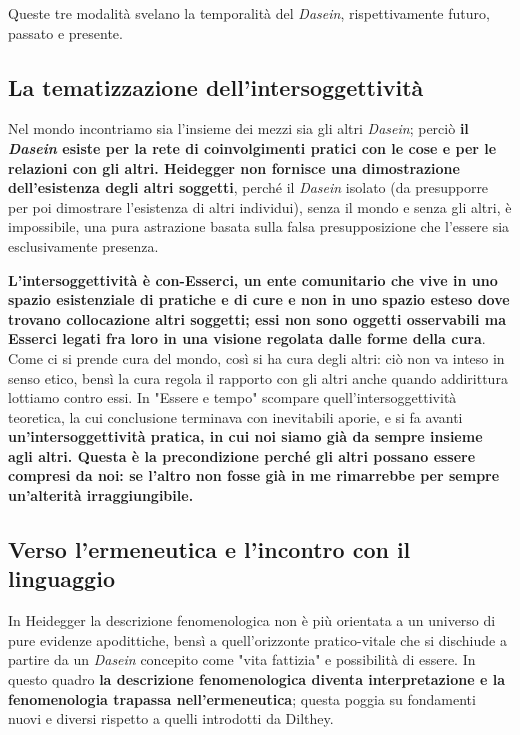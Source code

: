 Queste tre modalità svelano la temporalità del
\textit{Dasein}, rispettivamente futuro, passato e presente.

\subsection{La tematizzazione dell'intersoggettività}

Nel mondo incontriamo sia l'insieme dei mezzi
sia gli altri \textit{Dasein}; perciò \textbf{il \textit{Dasein} esiste per
la rete di coinvolgimenti pratici con le cose e
per le relazioni con gli altri. Heidegger non fornisce una dimostrazione dell'esistenza degli altri soggetti}, perché il \textit{Dasein} isolato (da presupporre per poi dimostrare l'esistenza di altri individui), senza il mondo e senza gli altri, è impossibile, una pura astrazione basata sulla falsa presupposizione che l'essere sia esclusivamente presenza.

\textbf{L'intersoggettività è con-Esserci, un ente comunitario che vive in uno spazio esistenziale di pratiche e di cure e non in uno spazio esteso dove trovano collocazione altri soggetti; essi non sono oggetti osservabili ma Esserci legati fra loro in una visione regolata dalle forme della cura}. Come ci si prende cura del mondo, così si ha cura degli altri: ciò non va inteso in senso etico, bensì la cura regola il rapporto con gli altri anche quando addirittura lottiamo contro essi.
In "Essere e tempo" scompare quell'intersoggettività teoretica, la cui conclusione terminava con inevitabili aporie, e si fa avanti \textbf{un'intersoggettività pratica, in cui noi siamo già da sempre insieme agli altri. Questa è la precondizione perché gli altri possano essere compresi da noi: se l'altro non fosse già in me rimarrebbe per sempre un'alterità irraggiungibile.}

\subsection{Verso l'ermeneutica e l'incontro con il linguaggio}

In Heidegger la descrizione fenomenologica non è
più orientata a un universo di pure evidenze
apodittiche, bensì a quell'orizzonte
pratico-vitale che si dischiude a partire da un
\textit{Dasein} concepito come "vita fattizia" e possibilità di essere. In questo
quadro \textbf{la descrizione fenomenologica diventa
interpretazione e la fenomenologia trapassa
nell'ermeneutica}; questa poggia su fondamenti nuovi
e diversi rispetto a quelli introdotti da Dilthey.

